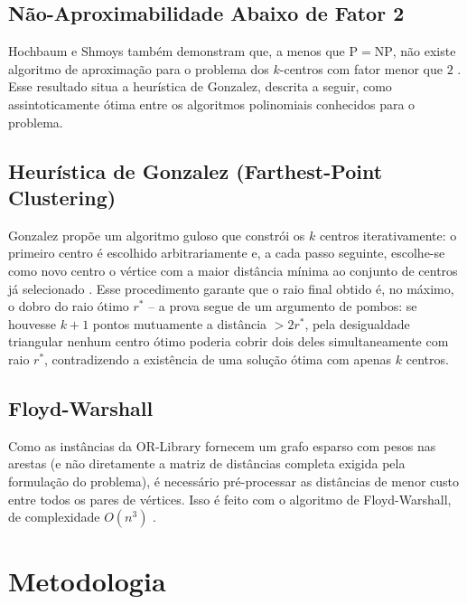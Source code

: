 \documentclass[10pt,twocolumn]{article}
\begin{document}
\subsection{N\~ao-Aproximabilidade Abaixo de Fator 2}

Hochbaum e Shmoys tamb\'em demonstram que, a menos que $\mathrm{P}=\mathrm{NP}$, n\~ao
existe algoritmo de aproxima\c{c}\~ao para o problema dos $k$-centros com fator menor que
$2$ \cite{hochbaum1985}. Esse resultado situa a heur\'istica de Gonzalez, descrita a
seguir, como assintoticamente \'otima entre os algoritmos polinomiais conhecidos para o
problema.

\subsection{Heur\'istica de Gonzalez (Farthest-Point Clustering)}

Gonzalez propõe um algoritmo guloso que constr\'oi os $k$ centros iterativamente: o
primeiro centro \'e escolhido arbitrariamente e, a cada passo seguinte, escolhe-se como
novo centro o v\'ertice com a maior dist\^ancia m\'inima ao conjunto de centros j\'a
selecionado \cite{gonzalez1985}. Esse procedimento garante que o raio final obtido
\'e, no m\'aximo, o dobro do raio \'otimo $r^{*}$ -- a prova segue de um argumento de
pombos: se houvesse $k+1$ pontos mutuamente a dist\^ancia $> 2r^{*}$, pela
desigualdade triangular nenhum centro \'otimo poderia cobrir dois deles
simultaneamente com raio $r^{*}$, contradizendo a exist\^encia de uma solu\c{c}\~ao
\'otima com apenas $k$ centros.

\subsection{Floyd-Warshall}

Como as inst\^ancias da OR-Library fornecem um grafo esparso com pesos nas arestas (e
n\~ao diretamente a matriz de dist\^ancias completa exigida pela formula\c{c}\~ao do
problema), \'e necess\'ario pr\'e-processar as dist\^ancias de menor custo entre todos
os pares de v\'ertices. Isso \'e feito com o algoritmo de Floyd-Warshall, de
complexidade $O(n^3)$ \cite{cormen2009}.

\section{Metodologia}
\end{document}
